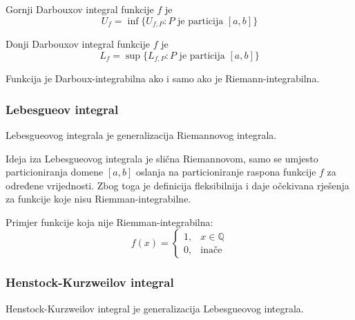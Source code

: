 \begin{definition}
    Gornji Darbouxov integral funkcije $f$ je
    $$
        U_f = \inf\{U_{f,P}: P \text{ je particija } [a,b]\}
    $$

    Donji Darbouxov integral funkcije $f$ je
    $$
        L_f = \sup\{L_{f,P}: P \text{ je particija } [a,b]\}
    $$
\end{definition}

Funkcija je Darboux-integrabilna ako i samo ako je Riemann-integrabilna.

\subsubsection{Lebesgueov integral}

\begin{multicols}{2}
Lebesgueovog integrala je generalizacija Riemannovog integrala.

Ideja iza Lebesgueovog integrala je slična Riemannovom, samo se umjesto
particioniranja domene $[a,b]$ oslanja na particioniranje raspona funkcije $f$
za određene vrijednosti. Zbog toga je definicija fleksibilnija i daje očekivana
rješenja za funkcije koje nisu Riemman-integrabilne.

Primjer funkcije koja nije Riemman-integrabilna:
$$
f(x) = \begin{cases}
    1,& x \in \mathbb{Q}\\
    0,& \text{inače}
\end{cases}
$$


\columnbreak

\raggedleft
\def\svgwidth{0.6\columnwidth}


\end{multicols}

\subsubsection{Henstock-Kurzweilov integral}

Henstock-Kurzweilov integral je generalizacija Lebesgueovog integrala.

